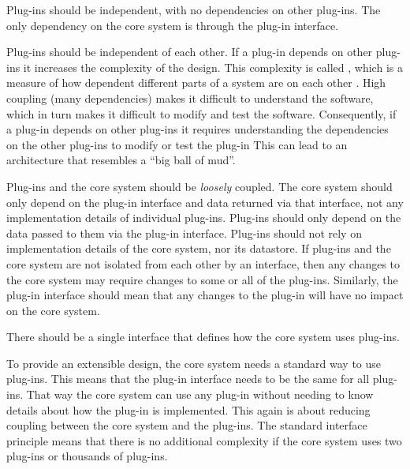 \begin{definition}\label{independent-plug-in}
    Plug-ins should be independent, with no dependencies on other plug-ins.
    The only dependency on the core system is through the plug-in interface.
\end{definition}

Plug-ins should be independent of each other.
If a plug-in depends on other plug-ins it increases the complexity of the design.
This complexity is called ,
which is a measure of how dependent different parts of a system are on each other \cite{glossary-architecture}.
High coupling (many dependencies) makes it difficult to understand the software,
which in turn makes it difficult to modify and test the software.
Consequently, if a plug-in depends on other plug-ins it requires understanding the dependencies on the other plug-ins to modify or test the plug-in
This can lead to an architecture that resembles a ``big ball of mud''.

Plug-ins and the core system should be \emph{loosely} coupled.
The core system should only depend on the plug-in interface and data returned via that interface, not any implementation details of individual plug-ins.
Plug-ins should only depend on the data passed to them via the plug-in interface.
Plug-ins should not rely on implementation details of the core system, nor its datastore.
If plug-ins and the core system are not isolated from each other by an interface,
then any changes to the core system may require changes to some or all of the plug-ins.
Similarly, the plug-in interface should mean that any changes to the plug-in will have no impact on the core system.

\vspace{1mm}
\begin{definition}\label{std-intf}
    There should be a single interface that defines how the core system uses plug-ins.
\end{definition}

To provide an extensible design, the core system needs a standard way to use plug-ins.
This means that the plug-in interface needs to be the same for all plug-ins.
That way the core system can use any plug-in without needing to know details about how the plug-in is implemented.
This again is about reducing coupling between the core system and the plug-ins.
The standard interface principle means that there is no additional complexity if the core system uses two plug-ins or thousands of plug-ins.


